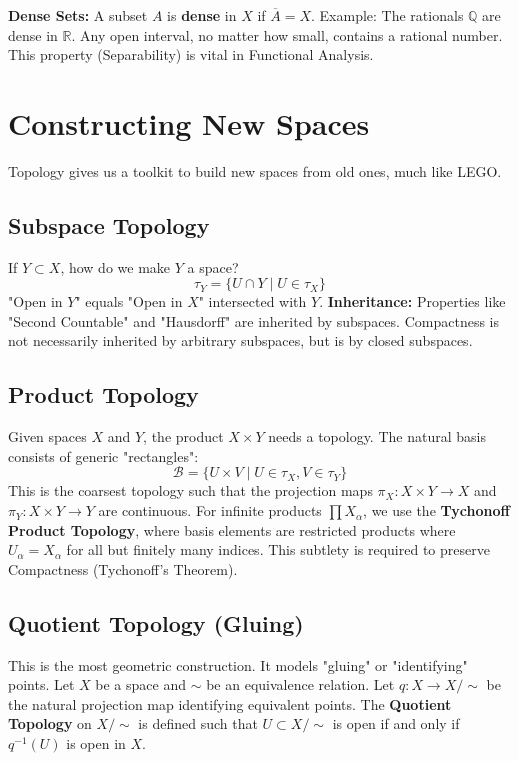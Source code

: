 \documentclass[oneside]{book}
\begin{document}
\textbf{Dense Sets:} A subset $A$ is \textbf{dense} in $X$ if $\overline{A} = X$.
Example: The rationals $\mathbb{Q}$ are dense in $\mathbb{R}$. Any open interval, no matter how small, contains a rational number. This property (Separability) is vital in Functional Analysis.

\section{Constructing New Spaces}

Topology gives us a toolkit to build new spaces from old ones, much like LEGO.

\subsection{Subspace Topology}
If $Y \subset X$, how do we make $Y$ a space?
\[ \tau_Y = \{ U \cap Y \mid U \in \tau_X \} \]
"Open in $Y$" equals "Open in $X$" intersected with $Y$.
\textbf{Inheritance:} Properties like "Second Countable" and "Hausdorff" are inherited by subspaces. Compactness is not necessarily inherited by arbitrary subspaces, but is by closed subspaces.

\subsection{Product Topology}
Given spaces $X$ and $Y$, the product $X \times Y$ needs a topology.
The natural basis consists of generic "rectangles":
\[ \mathcal{B} = \{ U \times V \mid U \in \tau_X, V \in \tau_Y \} \]
This is the coarsest topology such that the projection maps $\pi_X: X \times Y \to X$ and $\pi_Y: X \times Y \to Y$ are continuous.
For infinite products $\prod X_\alpha$, we use the \textbf{Tychonoff Product Topology}, where basis elements are restricted products where $U_\alpha = X_\alpha$ for all but finitely many indices. This subtlety is required to preserve Compactness (Tychonoff's Theorem).

\subsection{Quotient Topology (Gluing)}
This is the most geometric construction. It models "gluing" or "identifying" points.
Let $X$ be a space and $\sim$ be an equivalence relation. Let $q: X \to X/\sim$ be the natural projection map identifying equivalent points.
The \textbf{Quotient Topology} on $X/\sim$ is defined such that $U \subset X/\sim$ is open if and only if $q^{-1}(U)$ is open in $X$.
\end{document}
